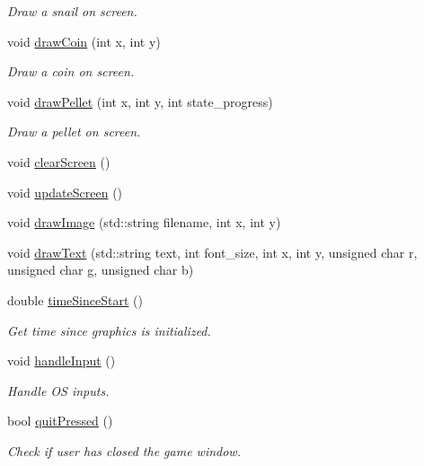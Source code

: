 \begin{DoxyCompactItemize}
\begin{DoxyCompactList}\small\item\em Draw a snail on screen. \end{DoxyCompactList}\item 
void \mbox{\hyperlink{class_graphics_a62b98d9f52ad55e9bd8617130cfbf37b}{draw\+Coin}} (int x, int y)
\begin{DoxyCompactList}\small\item\em Draw a coin on screen. \end{DoxyCompactList}\item 
void \mbox{\hyperlink{class_graphics_a63bc7bf1f68cfc785f08b6863d3034d2}{draw\+Pellet}} (int x, int y, int state\+\_\+progress)
\begin{DoxyCompactList}\small\item\em Draw a pellet on screen. \end{DoxyCompactList}\item 
void \mbox{\hyperlink{class_graphics_a68beb512b0697952ebafce249c86dbd3}{clear\+Screen}} ()
\item 
void \mbox{\hyperlink{class_graphics_a3621b0f55951fb891a5ac2ad7dd403a0}{update\+Screen}} ()
\item 
void \mbox{\hyperlink{class_graphics_afe0ce82b917ad83b8eaec222810f1efd}{draw\+Image}} (std\+::string filename, int x, int y)
\item 
void \mbox{\hyperlink{class_graphics_a3b78a92ad6cd4daaa44291df5c5c3e55}{draw\+Text}} (std\+::string text, int font\+\_\+size, int x, int y, unsigned char r, unsigned char g, unsigned char b)
\item 
double \mbox{\hyperlink{class_graphics_a35b4a23e0938ba205ce2a73ee7df5ea0}{time\+Since\+Start}} ()
\begin{DoxyCompactList}\small\item\em Get time since graphics is initialized. \end{DoxyCompactList}\item 
void \mbox{\hyperlink{class_graphics_adff993cdcd0ed498c82cf7be87ead4f1}{handle\+Input}} ()
\begin{DoxyCompactList}\small\item\em Handle OS inputs. \end{DoxyCompactList}\item 
bool \mbox{\hyperlink{class_graphics_ad6339f656cf977c3a0cdd8688c672125}{quit\+Pressed}} ()
\begin{DoxyCompactList}\small\item\em Check if user has closed the game window. \end{DoxyCompactList}\item 

\end{DoxyCompactItemize}
